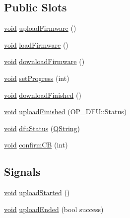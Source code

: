 \subsection*{\-Public \-Slots}
\begin{DoxyCompactItemize}
\item 
\hyperlink{group___u_a_v_objects_plugin_ga444cf2ff3f0ecbe028adce838d373f5c}{void} \hyperlink{group___uploader_ga51b53782cd70711b9ca91f81ef02565b}{upload\-Firmware} ()
\item 
\hyperlink{group___u_a_v_objects_plugin_ga444cf2ff3f0ecbe028adce838d373f5c}{void} \hyperlink{group___y_modem_uploader_gafbf692fdd482b85feb6510193a242a87}{load\-Firmware} ()
\item 
\hyperlink{group___u_a_v_objects_plugin_ga444cf2ff3f0ecbe028adce838d373f5c}{void} \hyperlink{group___uploader_ga988f01d143265ee96b4255b07b63fbf6}{download\-Firmware} ()
\item 
\hyperlink{group___u_a_v_objects_plugin_ga444cf2ff3f0ecbe028adce838d373f5c}{void} \hyperlink{group___uploader_ga8ac75c9483f273ed59faa116fe5699ee}{set\-Progress} (int)
\item 
\hyperlink{group___u_a_v_objects_plugin_ga444cf2ff3f0ecbe028adce838d373f5c}{void} \hyperlink{group___uploader_ga0809fb3c0a799a12c92704a36d3abf16}{download\-Finished} ()
\item 
\hyperlink{group___u_a_v_objects_plugin_ga444cf2ff3f0ecbe028adce838d373f5c}{void} \hyperlink{group___uploader_ga671fb25fd918e7eeac5c16bd1f1dfe86}{upload\-Finished} (\-O\-P\-\_\-\-D\-F\-U\-::\-Status)
\item 
\hyperlink{group___u_a_v_objects_plugin_ga444cf2ff3f0ecbe028adce838d373f5c}{void} \hyperlink{group___uploader_gac421d53cac355c47f763a62eab7675c1}{dfu\-Status} (\hyperlink{group___u_a_v_objects_plugin_gab9d252f49c333c94a72f97ce3105a32d}{\-Q\-String})
\item 
\hyperlink{group___u_a_v_objects_plugin_ga444cf2ff3f0ecbe028adce838d373f5c}{void} \hyperlink{group___y_modem_uploader_ga116ecb3aed92f7f793ea4769a7e0572d}{confirm\-C\-B} (int)
\end{DoxyCompactItemize}
\subsection*{\-Signals}
\begin{DoxyCompactItemize}
\item 
\hyperlink{group___u_a_v_objects_plugin_ga444cf2ff3f0ecbe028adce838d373f5c}{void} \hyperlink{group___y_modem_uploader_ga237b72fb1450126236fb690941ce7cf0}{upload\-Started} ()
\item 
\hyperlink{group___u_a_v_objects_plugin_ga444cf2ff3f0ecbe028adce838d373f5c}{void} \hyperlink{group___y_modem_uploader_ga80c1daefa8adc8af10178e3ad8c52307}{upload\-Ended} (bool success)
\end{DoxyCompactItemize}
